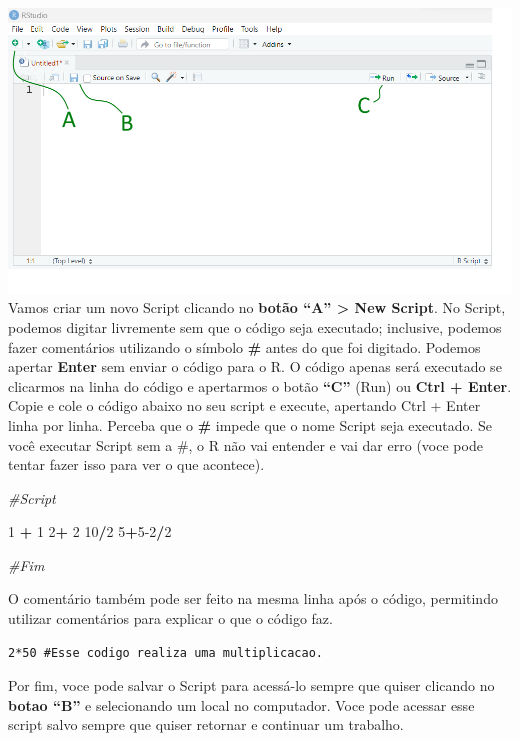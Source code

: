 \documentclass[
]{book}
\newenvironment{Shaded}{\begin{snugshade}}{\end{snugshade}}
\newcommand{\CommentTok}[1]{\textcolor[rgb]{0.56,0.35,0.01}{\textit{#1}}}
\newcommand{\DecValTok}[1]{\textcolor[rgb]{0.00,0.00,0.81}{#1}}
\newcommand{\SpecialCharTok}[1]{\textcolor[rgb]{0.81,0.36,0.00}{\textbf{#1}}}
\begin{document}
\includegraphics{img/Figura3_script.png}
Vamos criar um novo Script clicando no \textbf{botão ``A'' \textgreater{} New Script}. No Script, podemos digitar livremente sem que o código seja executado; inclusive, podemos fazer comentários utilizando o símbolo \textbf{\#} antes do que foi digitado. Podemos apertar \textbf{Enter} sem enviar o código para o R. O código apenas será executado se clicarmos na linha do código e apertarmos o botão \textbf{``C''} (Run) ou \textbf{Ctrl + Enter}. Copie e cole o código abaixo no seu script e execute, apertando Ctrl + Enter linha por linha. Perceba que o \textbf{\#} impede que o nome Script seja executado. Se você executar Script sem a \#, o R não vai entender e vai dar erro (voce pode tentar fazer isso para ver o que acontece).

\begin{Shaded}
\begin{Highlighting}[]
\CommentTok{\#Script }

\DecValTok{1} \SpecialCharTok{+} \DecValTok{1}
\DecValTok{2}\SpecialCharTok{+} \DecValTok{2}
\DecValTok{10}\SpecialCharTok{/}\DecValTok{2}
\DecValTok{5}\SpecialCharTok{+}\DecValTok{5{-}2}\SpecialCharTok{/}\DecValTok{2}

\CommentTok{\#Fim}
\end{Highlighting}
\end{Shaded}

O comentário também pode ser feito na mesma linha após o código, permitindo utilizar comentários para explicar o que o código faz.

\begin{verbatim}
2*50 #Esse codigo realiza uma multiplicacao.
\end{verbatim}

Por fim, voce pode salvar o Script para acessá-lo sempre que quiser clicando no \textbf{botao ``B''} e selecionando um local no computador. Voce pode acessar esse script salvo sempre que quiser retornar e continuar um trabalho.
\end{document}
